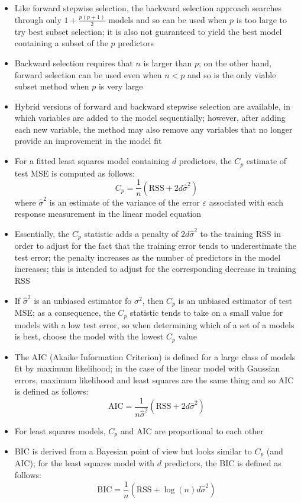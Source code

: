 \documentclass[12pt]{article}
\begin{document}
\begin{itemize}
\item Like forward stepwise selection, the backward selection approach searches through only $1 + \frac{p(p+1)}{2}$ models and so can be used when $p$ is too large to try best subset selection; it is also not guaranteed to yield the best model containing a subset of the $p$ predictors 
\item Backward selection requires that $n$ is larger than $p$; on the other hand, forward selection can be used even when $n < p$ and so is the only viable subset method when $p$ is very large 
\item Hybrid versions of forward and backward stepwise selection are available, in which variables are added to the model sequentially; however, after adding each new variable, the method may also remove any variables that no longer provide an improvement in the model fit
\item For a fitted least squares model containing $d$ predictors, the $C_p$ estimate of test MSE is computed as follows: 
$$C_p = \frac{1}{n}(\text{RSS} + 2d\hat{\sigma}^2)$$ where $\hat{\sigma}^2$ is an estimate of the variance of the error $\varepsilon$ associated with each response measurement in the linear model equation 
\item Essentially, the $C_p$ statistic adds a penalty of $2d\hat{\sigma}^2$ to the training RSS in order to adjust for the fact that the training error tends to underestimate the test error; the penalty increases as the number of predictors in the model increases; this is intended to adjust for the corresponding decrease in training RSS 
\item If $\hat{\sigma}^2$ is an unbiased estimator fo $\sigma^2$, then $C_p$ is an unbiased estimator of test MSE; as a consequence, the $C_p$ statistic tends to take on a small value for models with a low test error, so when determining which of a set of a models is best, choose the model with the lowest $C_p$ value 
\item The AIC (Akaike Information Criterion) is defined for a large class of models fit by maximum likelihood; in the case of the linear model with Gaussian errors, maximum likelihood and least squares are the same thing and so AIC is defined as follows: 
$$\text{AIC} = \frac{1}{n\hat{\sigma}^2}(\text{RSS} + 2d\hat{\sigma}^2)$$ 
\item For least squares models, $C_p$ and AIC are proportional to each other
\item BIC is derived from a Bayesian point of view but looks similar to $C_p$ (and AIC); for the least squares model with $d$ predictors, the BIC is defined as follows: $$ \text{BIC} = \frac{1}{n}(\text{RSS} + \log(n)d\hat{\sigma}^2) $$ 

\end{itemize}
\end{document}
